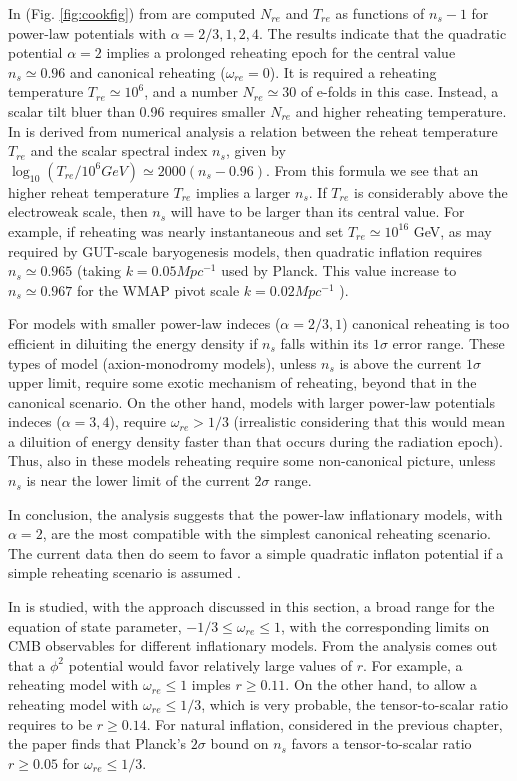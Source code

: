 \documentclass[11pt,a4paper,twoside]{book}
\begin{document}
 In (Fig. \ref{fig:cookfig}) from \cite{Chap3:Cook} are computed $ N_{re} $ and $ T_{re} $ as functions of $ n_{s}-1 $ for power-law potentials with $\alpha=2/3,1,2,4$. The results indicate that the quadratic potential $\alpha=2$ implies a prolonged reheating epoch for the central value $ n_{s} \simeq 0.96 $ and canonical reheating ($ \omega_{re} = 0 $). It is required a reheating temperature $ T_{re}\simeq 10^{6} $, and a number $ N_{re} \simeq 30 $ of e-folds in this case. Instead, a scalar tilt bluer than 0.96 requires smaller $ N_{re} $ and higher reheating temperature. In \cite{Chap3:Kai_Kamionkowsy}  is derived from  numerical analysis a relation between the reheat temperature $ T_{re} $ and the scalar spectral index $ n_{s} $, given by $ \log_{10}(T_{re}/10^{6}GeV) \simeq 2000(n_{s}-0.96) $. From this formula we see that an higher reheat temperature $ T_{re} $ implies a larger $ n_{s} $. If $ T_{re} $ is considerably above the electroweak scale, then $ n_{s} $ will have to be larger than its central value. For example, if reheating was nearly instantaneous and set $ T_{re}\simeq 10^{16} $ GeV, as may required by GUT-scale baryogenesis models, then quadratic inflation requires $ n_{s}\simeq 0.965 $ (taking $ k=0.05 Mpc^{-1} $ used by Planck. This value increase to $ n_{s} \simeq 0.967 $ for the WMAP pivot scale $ k=0.02 Mpc^{-1} $ ).
 
For models with smaller power-law indeces ($ \alpha=2/3,1 $) canonical reheating is too efficient in diluiting the energy density if $ n_{s} $ falls within its $ 1\sigma $ error range. These types of model (axion-monodromy models), unless $ n_{s} $ is above the current $ 1\sigma  $ upper limit, require some exotic mechanism of reheating, beyond that in the canonical scenario. On the other hand, models with larger power-law potentials indeces ($\alpha=3,4$), require $\omega_{re} > 1/3 $ (irrealistic considering that this would mean a diluition of energy density faster than that occurs during the radiation epoch). Thus, also in these models reheating  require some non-canonical picture, unless $ n_{s} $ is near the lower limit of the current $ 2\sigma $ range.

In conclusion, the analysis suggests that the power-law inflationary models, with $ \alpha=2 $, are the most compatible with the simplest canonical reheating scenario. The current data then do seem to favor a simple quadratic inflaton potential if a simple reheating scenario is assumed \cite{Chap3:Cook}.

In \cite{Chap3:Cook} is studied, with the approach discussed in this section, a broad range for the equation of state parameter, $ -1/3 \le \omega_{re} \le 1 $,  with the corresponding limits on CMB observables for different inflationary models. From the analysis comes out that a $\phi^{2}$ potential would favor relatively large values of $ r $. For example, a reheating model with $ \omega_{re} \le 1 $ imples $ r\ge 0.11 $. On the other hand, to allow a reheating model with $\omega_{re} \le 1/3$, which is very probable, the tensor-to-scalar ratio requires to be $ r\ge 0.14 $. For natural inflation, considered in the previous chapter, the paper finds that  Planck's $ 2\sigma $ bound on $ n_{s} $ favors a tensor-to-scalar ratio $ r\ge 0.05 $ for $ \omega_{re} \le 1/3 $.
\end{document}
